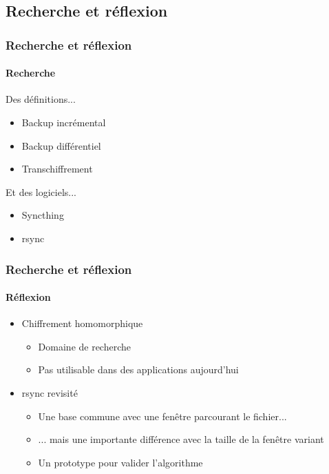 \documentclass{beamer}
\begin{document}
\subsection{Recherche et réflexion}
\begin{frame}
 \frametitle{Recherche et réflexion}
 \framesubtitle{Recherche}
 Des définitions...
 \begin{itemize}
  \item Backup incrémental
  \item Backup différentiel
  \item Transchiffrement\\[0.51cm]
 \end{itemize}
 
 Et des logiciels...
 \begin{itemize}
  \item Syncthing
  \item rsync
 \end{itemize}
\end{frame}

\begin{frame}
 \frametitle{Recherche et réflexion}
 \framesubtitle{Réflexion}
 \begin{itemize}
  \item Chiffrement homomorphique
  \begin{itemize}
   \item Domaine de recherche
   \item Pas utilisable dans des applications aujourd'hui
  \end{itemize}
  \item rsync revisité
  \begin{itemize}
   \item Une base commune avec une fenêtre parcourant le fichier...
   \item ... mais une importante différence avec la taille de la fenêtre
   variant
   \item Un prototype pour valider l'algorithme
  \end{itemize}
 \end{itemize}
\end{frame}
\end{document}
